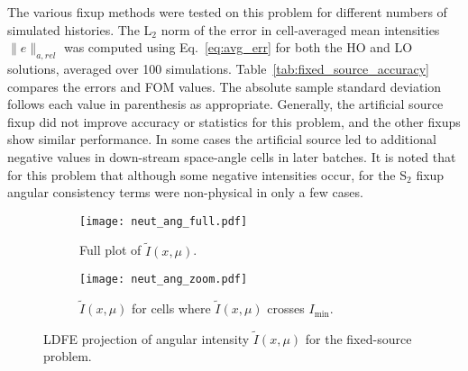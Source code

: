 The various fixup methods were tested on this problem for different numbers of simulated histories.  The L$_2$
norm of the error in cell-averaged mean intensities $\|e\|_{a,rel}$ was computed using
Eq.~\eqref{eq:avg_err} for both the HO and LO solutions, averaged over 100
simulations.  Table~\ref{tab:fixed_source_accuracy} compares the errors and FOM values. 
The absolute sample standard deviation follows each value in parenthesis 
as appropriate.  Generally, the artificial source fixup did not improve accuracy or
statistics for this problem, and the other fixups show similar performance.
In some cases
the artificial source led to additional negative values in down-stream space-angle cells in later
batches.  It is noted that for
this problem that although some negative intensities occur, for the S$_2$ fixup angular consistency terms
were non-physical in only a few cases.  
\begin{figure}[hp]
    \centering
\begin{subfigure}{0.7\textwidth}
  \centering
    \texttt{[image: neut\_ang\_full.pdf]}
    \caption{\label{fig:neut_ang_full} Full plot of $\tilde I(x,\mu)$.}
\end{subfigure}
\begin{subfigure}{0.7\textwidth}
  \centering
  \texttt{[image: neut\_ang\_zoom.pdf]}
  \caption{\label{fig:neut_ang_zoom} $\tilde I(x,\mu)$ for cells where $\tilde I(x,\mu)$
  crosses $I_{\min}$.   }
\end{subfigure}
\caption{LDFE projection of angular intensity $\tilde I(x,\mu)$ for the fixed-source problem.}
\end{figure}

